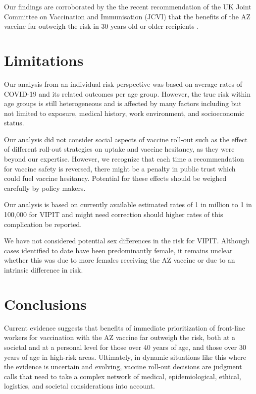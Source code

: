 \documentclass[]{interact}
\theoremstyle{plain}%
\theoremstyle{definition}
\theoremstyle{remark}
\begin{document}
Our findings are corroborated by the the recent recommendation of the UK
Joint Committee on Vaccination and Immunisation (JCVI) that the benefits
of the AZ vaccine far outweigh the risk in 30 years old or older
recipients \citep{jcvi_jcvi_2021}.

\hypertarget{limitations}{%
\section{Limitations}\label{limitations}}

Our analysis from an individual risk perspective was based on average
rates of COVID-19 and its related outcomes per age group. However, the
true risk within age groups is still heterogeneous and is affected by
many factors including but not limited to exposure, medical history,
work environment, and socioeconomic status.

Our analysis did not consider social aspects of vaccine roll-out such as
the effect of different roll-out strategies on uptake and vaccine
hesitancy, as they were beyond our expertise. However, we recognize that
each time a recommendation for vaccine safety is reversed, there might
be a penalty in public trust which could fuel vaccine hesitancy.
Potential for these effects should be weighed carefully by policy
makers.

Our analysis is based on currently available estimated rates of 1 in
million to 1 in 100,000 for VIPIT and might need correction should
higher rates of this complication be reported.

We have not considered potential sex differences in the risk for VIPIT.
Although cases identified to date have been predominantly female, it
remains unclear whether this was due to more females receiving the AZ
vaccine or due to an intrinsic difference in risk.

\hypertarget{conclusions}{%
\section{Conclusions}\label{conclusions}}

Current evidence suggests that benefits of immediate prioritization of
front-line workers for vaccination with the AZ vaccine far outweigh the
risk, both at a societal and at a personal level for those over 40 years
of age, and those over 30 years of age in high-risk areas. Ultimately,
in dynamic situations like this where the evidence is uncertain and
evolving, vaccine roll-out decisions are judgment calls that need to
take a complex network of medical, epidemiological, ethical, logistics,
and societal considerations into account.






\end{document}

